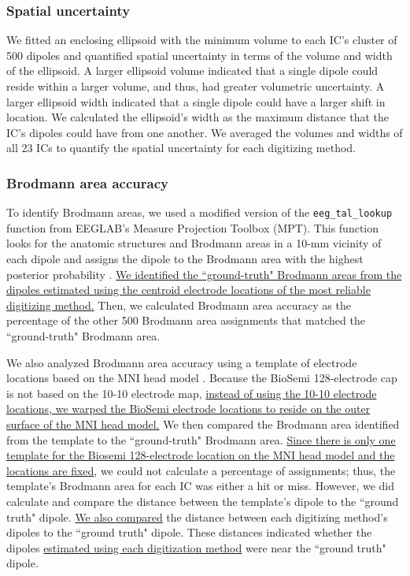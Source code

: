 \documentclass[../thesis_seyed.tex]{subfiles}
\begin{document}
\subsubsection{Spatial uncertainty}
We fitted an enclosing ellipsoid with the minimum volume to each IC's cluster of 500 dipoles \cite{Moshtagh2005-em} and quantified spatial uncertainty in terms of the volume and width of the ellipsoid. A larger ellipsoid volume indicated that a single dipole could reside within a larger volume, and thus, had greater volumetric uncertainty. A larger ellipsoid width indicated that a single dipole could have a larger shift in location. We calculated the ellipsoid's width as the maximum distance that the IC's dipoles could have from one another. We averaged the volumes and widths of all 23 ICs to quantify the spatial uncertainty for each digitizing method. 
    
\subsubsection{Brodmann area accuracy}    
To identify Brodmann areas, we used a modified version of the {\tt \texttt{eeg\_tal\_lookup}} function from EEGLAB's Measure Projection Toolbox (MPT). This function looks for the anatomic structures and Brodmann areas in a 10-mm vicinity of each dipole and assigns the dipole to the Brodmann area with the highest posterior probability \cite{Bigdely-Shamlo2013-jv,Lancaster2000-aj}. \ul{We identified the ``ground-truth" Brodmann areas from the dipoles estimated using the centroid electrode locations of the most reliable digitizing method.} Then, we calculated Brodmann area accuracy as the percentage of the other 500 Brodmann area assignments that matched the ``ground-truth" Brodmann area. 

We also analyzed Brodmann area accuracy using a template of electrode locations based on the MNI head model \cite{Oostenveld2001-vg}. Because the BioSemi 128-electrode cap is not based on the 10-10 electrode map, \ul{instead of using the 10-10 electrode locations, we warped the BioSemi electrode locations to reside on the outer surface of the MNI head model.} We then compared the Brodmann area identified from the template to the ``ground-truth" Brodmann area. \ul{Since there is only one template for the Biosemi 128-electrode location on the MNI head model and the locations are fixed}, we could not calculate a percentage of assignments; thus, the template's Brodmann area for each IC was either a hit or miss. However, we did calculate and compare the distance between the template's dipole to the ``ground truth" dipole. \ul{We also compared} the distance between each digitizing method's dipoles to the ``ground truth" dipole. These distances indicated whether the dipoles \ul{estimated using each digitization method} were near the ``ground truth" dipole. 
\end{document}
